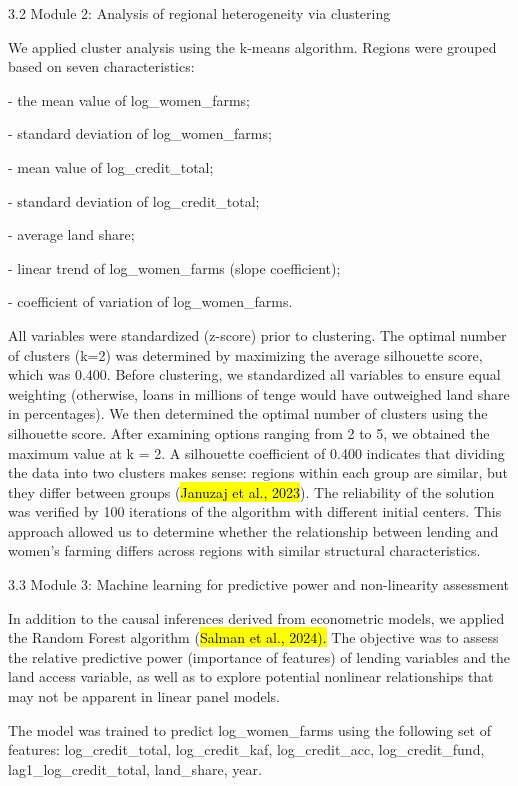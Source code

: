 \documentclass[
]{article}
\begin{document}
3.2 Module 2: Analysis of regional heterogeneity via clustering

We applied cluster analysis using the k-means algorithm. Regions were
grouped based on seven characteristics:

- the mean value of log\_women\_farms;

- standard deviation of log\_women\_farms;

- mean value of log\_credit\_total;

- standard deviation of log\_credit\_total;

- average land share;

- linear trend of log\_women\_farms (slope coefficient);

- coefficient of variation of log\_women\_farms.

All variables were standardized (z-score) prior to clustering. The
optimal number of clusters (k=2) was determined by maximizing the
average silhouette score, which was 0.400. Before clustering, we
standardized all variables to ensure equal weighting (otherwise, loans
in millions of tenge would have outweighed land share in percentages).
We then determined the optimal number of clusters using the silhouette
score. After examining options ranging from 2 to 5, we obtained the
maximum value at k = 2. A silhouette coefficient of 0.400 indicates that
dividing the data into two clusters makes sense: regions within each
group are similar, but they differ between groups (\hl{Januzaj et al.,
2023}). The reliability of the solution was verified by 100 iterations
of the algorithm with different initial centers. This approach allowed
us to determine whether the relationship between lending and women's
farming differs across regions with similar structural characteristics.

3.3 Module 3: Machine learning for predictive power and non-linearity
assessment

In addition to the causal inferences derived from econometric models, we
applied the Random Forest algorithm (\hl{Salman et al., 2024).} The
objective was to assess the relative predictive power (importance of
features) of lending variables and the land access variable, as well as
to explore potential nonlinear relationships that may not be apparent in
linear panel models.

The model was trained to predict log\_women\_farms using the following
set of features: log\_credit\_total, log\_credit\_kaf, log\_credit\_acc,
log\_credit\_fund, lag1\_log\_credit\_total, land\_share, year.
\end{document}
